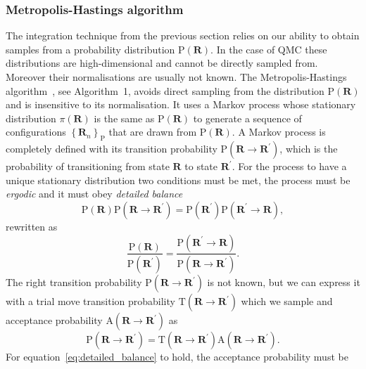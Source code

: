 \subsubsection{Metropolis-Hastings algorithm}
The integration technique from the previous section relies on our ability to obtain samples from a probability distribution $\mathrm{P}(\mathbf{R})$. In the case of QMC these distributions are high-dimensional and cannot be directly sampled from. Moreover their normalisations are usually not known. 
The Metropolis-Hastings algorithm~\cite{hastings1970monte}, see Algorithm~1, avoids direct sampling from the distribution $\mathrm{P}(\mathbf{R})$ and is insensitive to its normalisation. It uses a Markov process whose stationary distribution $\pi(\mathbf{R})$ is the same as $\mathrm{P}(\mathbf{R})$	
to generate a sequence of configurations $\left\{\mathbf{R}_n\right\}_\mathrm{P}$ 
that are drawn from $\mathrm{P}(\mathbf{R})$. A Markov process is completely defined with its transition probability $\mathrm{P}(\mathbf{R} \rightarrow \mathbf{R}^\prime)$, which is the probability of transitioning from state $\mathbf{R}$ to state $\mathbf{R}^\prime$. For the process to have a unique stationary distribution two conditions must be met, the process must be \emph{ergodic} and it must obey \emph{detailed balance}
\begin{equation}
	\mathrm{P}(\mathbf{R}) \mathrm P(\mathbf{R} \rightarrow \mathbf{R}^\prime) = \mathrm{P}(\mathbf{R}^\prime) \mathrm P(\mathbf{R}^\prime \rightarrow \mathbf{R}),
\end{equation}
rewritten as
\begin{equation}
	\label{eq:detailed_balance}
	\frac{\mathrm P ({\mathbf{R}})}{\mathrm P ({\mathbf{R}^\prime})} = \frac{\mathrm P(\mathbf{R}^\prime \rightarrow \mathbf{R})}{\mathrm P(\mathbf{R} \rightarrow \mathbf{R}^\prime)}.
\end{equation}
The right transition probability $\mathrm P(\mathbf{R} \rightarrow \mathbf{R}^\prime)$ is not known, but we can express it with a trial move transition probability $\mathrm{T}(\mathbf{R} \rightarrow \mathbf{R}^\prime)$ which we sample and acceptance probability $\mathrm{A}(\mathbf{R} \rightarrow \mathbf{R}^\prime)$ as
\begin{equation}
	\mathrm P(\mathbf{R} \rightarrow \mathbf{R}^\prime) = \mathrm T(\mathbf{R} \rightarrow \mathbf{R}^\prime) \mathrm A(\mathbf{R} \rightarrow \mathbf{R}^\prime).
\end{equation}
For equation~\eqref{eq:detailed_balance} to hold, the acceptance probability must be 
